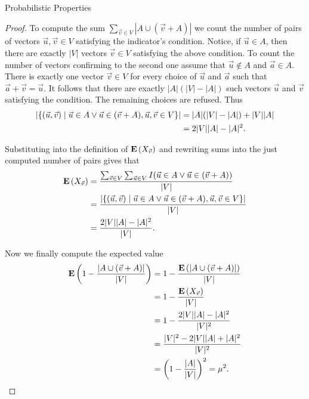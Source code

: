 \begin{section}{Probabilistic Properties}
\begin{lemma}
\begin{proof}
To compute the sum $\sum_{\vec{v} \in V}|A \cup (\vec{v} + A)|$ we count the number of pairs of vectors $\vec{u}, \vec{v} \in V$ satisfying the indicator's condition. Notice, if $\vec{u} \in A$, then there are exactly $|V|$ vectors $\vec{v} \in V$ satisfying the above condition. To count the number of vectors confirming to the second one assume that $\vec{u} \notin A$ and $\vec{a} \in A$. There is exactly one vector $\vec{v} \in V$ for every choice of $\vec{u}$ and $\vec{a}$ such that $\vec{a} + \vec{v} = \vec{u}$. It follows that there are exactly $|A|(|V| - |A|)$ such vectors $\vec{u}$ and $\vec{v}$ satisfying the condition. The remaining choices are refused. Thus
\[ 
\begin{split}
|\{(\vec{u}, \vec{v}) \mid \vec{u} \in A \vee \vec{u} \in (\vec{v} + A), \vec{u}, \vec{v} \in V \}| 
	& = |A|(|V| - |A|) + |V||A| \\
	& = 2|V||A| - |A|^2 \text{.} \\
\end{split}
\]

Substituting into the definition of $\mathbf{E}\left(X_{\vec{v}}\right)$ and rewriting sums into the just computed number of pairs gives that
\[
\begin{split}
\mathbf{E}\left(X_{\vec{v}}\right) 
	& = \frac{\sum_{\vec{v} \in V} \sum_{\vec{u} \in V} I(\vec{u} \in A \vee \vec{u} \in (\vec{v} + A))}{|V|}  \\
	& = \frac{|\{(\vec{u}, \vec{v}) \mid \vec{u} \in A \vee \vec{u} \in (\vec{v} + A), \vec{u}, \vec{v} \in V \}|}{|V|} \\ 
	& = \frac{2|V||A| - |A|^2}{|V|} \text{.}
\end{split}
\]

Now we finally compute the expected value
\[
\begin{split}
\mathbf{E}\left(1 - \frac{|A \cup (\vec{v} + A)|}{|V|}\right) 
	& = 1 - \frac{\mathbf{E}\left(|A \cup (\vec{v} + A)|\right)}{|V|}  \\
	& = 1 - \frac{\mathbf{E}\left(X_{\vec{v}}\right)}{|V|} \\
	& = 1 - \frac{2|V||A| - |A|^2}{|V|^2} \\
	& = \frac{|V|^2 - 2|V||A| + |A|^2}{|V|^2} \\
	& = \left(1 - \frac{|A|}{|V|}\right)^2 = \mu^2 \text{.}
\end{split}
\]
\end{proof}
\end{lemma}


\end{section}
